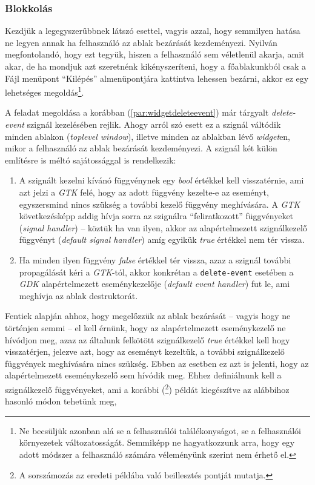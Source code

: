 \subsubsection{Blokkolás}

Kezdjük a legegyszerűbbnek látszó esettel, vagyis azzal, hogy semmilyen hatása ne legyen annak ha felhasználó az ablak bezárását kezdeményezi. Nyilván megfontolandó, hogy ezt tegyük, hiszen a felhasználó sem véletlenül akarja, amit akar, de ha mondjuk azt szeretnénk kikényszeríteni, hogy a főablakunkból csak a Fájl menüpont ``Kilépés'' almenüpontjára kattintva lehessen bezárni, akkor ez egy lehetséges megoldás\footnote{Ne becsüljük azonban alá se a felhasználói találékonyságot, se a felhasználói környezetek változatosságát. Semmiképp ne hagyatkozzunk arra, hogy egy adott módszer a felhasználó számára véleményünk szerint nem érhető el.}.

A feladat megoldása a korábban (\ref{par:widgetdeleteevent}) már tárgyalt \textit{delete-event} szignál kezelésében rejlik. Ahogy arról szó esett ez a szignál váltódik minden ablakon (\textit{toplevel window}), illetve minden az ablakban lévő \textit{widget}en, mikor a felhasználó az ablak bezárását kezdeményezi. A szignál két külön említésre is méltó sajátossággal is rendelkezik:

\begin{enumerate}
 \item A szignált kezelni kívánó függvénynek egy \textit{bool} értékkel kell visszatérnie, ami azt jelzi a \textit{GTK} felé, hogy az adott függvény kezelte-e az eseményt, egyszersmind nincs szükség a további kezelő függvény meghívására. A \textit{GTK} következésképp addig hívja sorra az szignálra ``feliratkozott'' függvényeket (\textit{signal handler}) -- köztük ha van ilyen, akkor az alapértelmezett szignálkezelő függvényt (\textit{default signal handler}) amíg egyikük \textit{true} értékkel nem tér vissza.
 \item Ha minden ilyen függvény \textit{false} értékkel tér vissza, azaz a szignál további propagálását kéri a \textit{GTK}-tól, akkor konkrétan a \texttt{delete-event} esetében a \textit{GDK} alapértelmezett eseménykezelője (\textit{default event handler}) fut le, ami meghívja az ablak destruktorát.
\end{enumerate}

Fentiek alapján ahhoz, hogy megelőzzük az ablak bezárását -- vagyis hogy ne történjen semmi -- el kell érnünk, hogy az alapértelmezett eseménykezelő ne hívódjon meg, azaz az általunk felkötött szignálkezelő \textit{true} értékkel kell hogy visszatérjen, jelezve azt, hogy az eseményt kezeltük, a további szignálkezelő függvények meghívására nincs szükség. Ebben az esetben ez azt is jelenti, hogy az alapértelmezett eseménykezelő sem hívódik meg. Ehhez definiálnunk kell a szignálkezelő  függvényeket, ami a korábbi (\footnote{A sorszámozás az eredeti példába való beillesztés pontját mutatja.}) példát kiegészítve az alábbihoz hasonló módon tehetünk meg,

